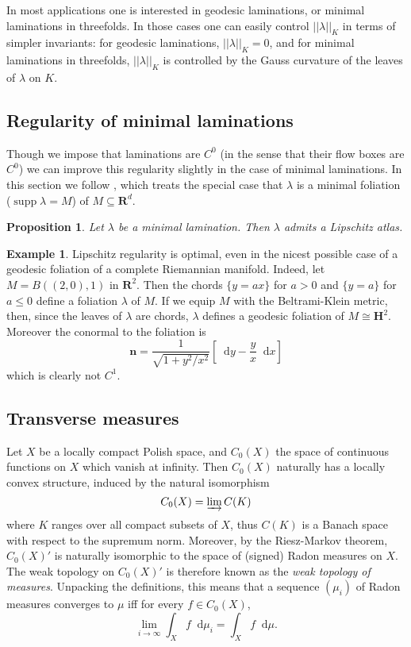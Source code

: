 \documentclass[reqno,10pt]{amsart}
\newcommand{\RR}{\mathbf{R}}
\newcommand{\Hyp}{\mathbf H}
\newcommand*\dif{\mathop{}\!\mathrm{d}}
\DeclareMathOperator{\supp}{supp}
\newcommand{\normal}{\mathbf n}
\newcommand{\dfn}[1]{\emph{#1}\index{#1}}
\newtheorem{proposition}[theorem]{Proposition}
\theoremstyle{definition}
\newtheorem{example}[theorem]{Example}
\numberwithin{equation}{section}
\begin{document}
In most applications one is interested in geodesic laminations, or minimal laminations in threefolds.
In those cases one can easily control $||\lambda||_K$ in terms of simpler invariants: for geodesic laminations, $||\lambda||_K = 0$, and for minimal laminations in threefolds, $||\lambda||_K$ is controlled by the Gauss curvature of the leaves of $\lambda$ on $K$.


\subsection{Regularity of minimal laminations}
Though we impose that laminations are $C^0$ (in the sense that their flow boxes are $C^0$) we can improve this regularity slightly in the case of minimal laminations.
In this section we follow \cite{Solomon86}, which treats the special case that $\lambda$ is a minimal foliation ($\supp \lambda = M$) of $M \subseteq \RR^d$.

\begin{proposition}
Let $\lambda$ be a minimal lamination. Then $\lambda$ admits a Lipschitz atlas.
\end{proposition}

\begin{example}
Lipschitz regularity is optimal, even in the nicest possible case of a geodesic foliation of a complete Riemannian manifold.
Indeed, let $M = B((2, 0), 1)$ in $\RR^2$. Then the chords $\{y = ax\}$ for $a > 0$ and $\{y = a\}$ for $a \leq 0$ define a foliation $\lambda$ of $M$.
If we equip $M$ with the Beltrami-Klein metric, then, since the leaves of $\lambda$ are chords, $\lambda$ defines a geodesic foliation of $M \cong \Hyp^2$.
Moreover the conormal to the foliation is 
$$\normal = \frac{1}{\sqrt{1 + y^2/x^2}} \left[\dif y - \frac{y}{x} \dif x\right]$$
which is clearly not $C^1$.
\end{example}

\subsection{Transverse measures}
Let $X$ be a locally compact Polish space, and $C_0(X)$ the space of continuous functions on $X$ which vanish at infinity.
Then $C_0(X)$ naturally has a locally convex structure, induced by the natural isomorphism 
$$C_0(X) = \varinjlim C(K)$$
where $K$ ranges over all compact subsets of $X$, thus $C(K)$ is a Banach space with respect to the supremum norm.
Moreover, by the Riesz-Markov theorem, $C_0(X)'$ is naturally isomorphic to the space of (signed) Radon measures on $X$.
The weak topology on $C_0(X)'$ is therefore known as the \dfn{weak topology of measures}.
Unpacking the definitions, this means that a sequence $(\mu_i)$ of Radon measures converges to $\mu$ iff for every $f \in C_0(X)$,
$$\lim_{i \to \infty} \int_X f \dif \mu_i = \int_X f \dif \mu.$$
\end{document}
